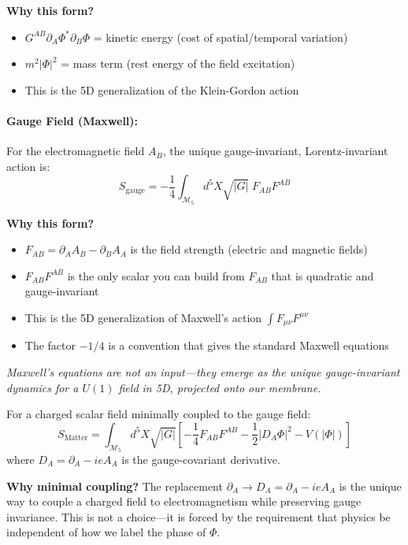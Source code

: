 \textbf{Why this form?}
\begin{itemize}
    \item $G^{AB}\partial_A\Phi^*\partial_B\Phi$ = kinetic energy (cost of spatial/temporal variation)
    \item $m^2|\Phi|^2$ = mass term (rest energy of the field excitation)
    \item This is the 5D generalization of the Klein-Gordon action
\end{itemize}

\paragraph{Gauge Field (Maxwell):}

For the electromagnetic field $A_B$, the unique gauge-invariant, Lorentz-invariant action is:
\begin{equation}
S_{\text{gauge}} = -\frac{1}{4}\int_{\mathcal{M}_5} d^5X \sqrt{|G|} \; F_{AB}F^{AB}
\label{eq:gauge_action}
\end{equation}

\textbf{Why this form?}
\begin{itemize}
    \item $F_{AB} = \partial_A A_B - \partial_B A_A$ is the field strength (electric and magnetic fields)
    \item $F_{AB}F^{AB}$ is the only scalar you can build from $F_{AB}$ that is quadratic and gauge-invariant
    \item This is the 5D generalization of Maxwell's action $\int F_{\mu\nu}F^{\mu\nu}$
    \item The factor $-1/4$ is a convention that gives the standard Maxwell equations
\end{itemize}

\textit{Maxwell's equations are not an input---they emerge as the unique gauge-invariant dynamics for a $U(1)$ field in 5D, projected onto our membrane.}

\begin{tcolorbox}[colback=yellow!10,colframe=orange!70,title=Complete Matter Action]
For a charged scalar field minimally coupled to the gauge field:
\begin{equation}
S_{\text{Matter}} = \int_{\mathcal{M}_5} d^5X \sqrt{|G|} \left[ -\frac{1}{4}F_{AB}F^{AB} - \frac{1}{2}|D_A\Phi|^2 - V(|\Phi|) \right]
\label{eq:complete_matter}
\end{equation}
where $D_A = \partial_A - ieA_A$ is the gauge-covariant derivative.

\textbf{Why minimal coupling?} The replacement $\partial_A \to D_A = \partial_A - ieA_A$ is the unique way to couple a charged field to electromagnetism while preserving gauge invariance. This is not a choice---it is forced by the requirement that physics be independent of how we label the phase of $\Phi$.
\end{tcolorbox}

